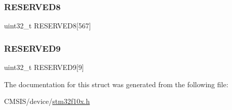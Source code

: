 \mbox{\label{struct_e_t_h___type_def_a89165a9d5e2a0107362a009e76f3ace2}} 
\subsubsection{\texorpdfstring{RESERVED8}{RESERVED8}}
{\footnotesize\ttfamily uint32\+\_\+t R\+E\+S\+E\+R\+V\+E\+D8\mbox{[}567\mbox{]}}

\mbox{\label{struct_e_t_h___type_def_ae7f5b577c875aae3016bf2478faaf62a}} 
\subsubsection{\texorpdfstring{RESERVED9}{RESERVED9}}
{\footnotesize\ttfamily uint32\+\_\+t R\+E\+S\+E\+R\+V\+E\+D9\mbox{[}9\mbox{]}}



The documentation for this struct was generated from the following file\+:\begin{DoxyCompactItemize}
\item 
C\+M\+S\+I\+S/device/\mbox{\hyperlink{stm32f10x_8h}{stm32f10x.\+h}}\end{DoxyCompactItemize}
